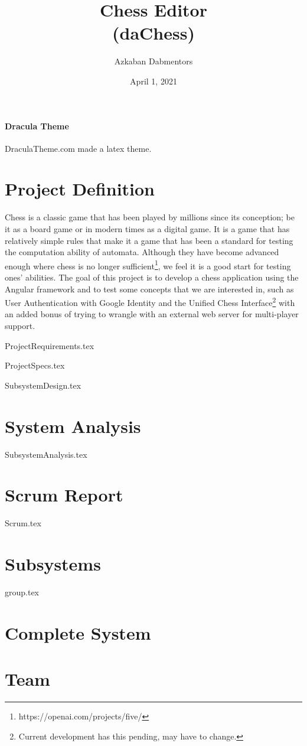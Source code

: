 \documentclass[12pt]{article}
\title{\color{draculacyan}Chess Editor\\(daChess)}
\author{\color{draculared}Azkaban Dabmentors}
\date{\color{draculared}April 1, 2021}
\begin{document}
	\paragraph{Dracula Theme}
	DraculaTheme.com made a latex theme.
	\maketitle
	
	\section{Project Definition}
	Chess is a classic game that has been played by millions since its conception; be it as a board game or in modern times as a digital game. It is a game that has relatively simple rules that make it a game that has been a standard for testing the computation ability of automata. Although they have become advanced enough where chess is no longer sufficient\footnote{https://openai.com/projects/five/}, we feel it is a good start for testing ones' abilities. The goal of this project is to develop a chess application using the Angular framework and to test some concepts that we are interested in, such as User Authentication with Google Identity and the Unified Chess Interface\footnote{Current development has this pending, may have to change.}  with an added bonus of trying to wrangle with an external web server for multi-player support.
	
	
	\newpage
	{ProjectRequirements.tex}
	
	\newpage
	{ProjectSpecs.tex}
	
	\newpage
	{SubsystemDesign.tex}
	\section{System Analysis}
	{SubsystemAnalysis.tex}
	\section{Scrum Report}
	{Scrum.tex}
	\section{Subsystems}
	{group.tex}
	
	\section{Complete System}
	\section{Team}
	
\end{document}
